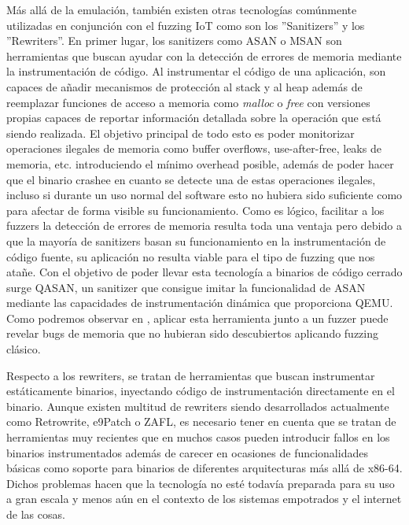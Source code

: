 Más allá de la emulación, también existen otras tecnologías comúnmente utilizadas en conjunción con el fuzzing IoT como son los ''Sanitizers'' y los
''Rewriters''. En primer lugar, los sanitizers como ASAN\cite{Serebryany2012} o MSAN\cite{Stepanov2015} son herramientas que buscan ayudar con la detección de errores de memoria mediante la instrumentación 
de código. Al instrumentar el código de una aplicación, son capaces de añadir mecanismos de protección al stack y al heap además de reemplazar funciones
de acceso a memoria como \textit{malloc} o \textit{free} con versiones propias capaces de reportar información detallada sobre la operación que está siendo 
realizada. El objetivo principal de todo esto es poder monitorizar operaciones ilegales de memoria como buffer overflows,
use-after-free, leaks de memoria, etc. introduciendo el mínimo overhead posible, además de poder hacer que el binario crashee en cuanto se detecte una de estas
operaciones ilegales, incluso si durante un uso normal del software esto no hubiera sido suficiente como para afectar de forma visible su funcionamiento. 
Como es lógico, facilitar a los fuzzers la detección de errores de memoria resulta toda una ventaja pero debido a que la mayoría de sanitizers basan su
funcionamiento en la instrumentación de código fuente, su aplicación no resulta viable para el tipo de fuzzing que nos atañe. Con el objetivo de poder 
llevar esta tecnología a binarios de código cerrado surge QASAN\cite{Fioraldi2020}, un sanitizer que consigue imitar la funcionalidad de ASAN\cite{Serebryany2012} 
mediante las capacidades de instrumentación dinámica que proporciona QEMU. Como podremos observar en , aplicar esta herramienta 
junto a un fuzzer puede revelar bugs de memoria que no hubieran sido descubiertos aplicando fuzzing clásico. \bigskip

Respecto a los rewriters, se tratan de herramientas que buscan instrumentar estáticamente binarios, inyectando código de instrumentación directamente en 
el binario. Aunque existen multitud de rewriters siendo desarrollados actualmente como Retrowrite\cite{Dinesh2020}, e9Patch\cite{Duck2020} o 
ZAFL\cite{Nagy2021}, es necesario tener en cuenta que se tratan de herramientas muy recientes que en muchos casos pueden introducir fallos en los binarios
instrumentados además de carecer en ocasiones de funcionalidades básicas como soporte para binarios de diferentes arquitecturas más allá de x86-64. 
Dichos problemas hacen que la tecnología no esté todavía preparada para su uso a gran escala y menos aún en el contexto de los sistemas empotrados y el 
internet de las cosas.
\bigskip

